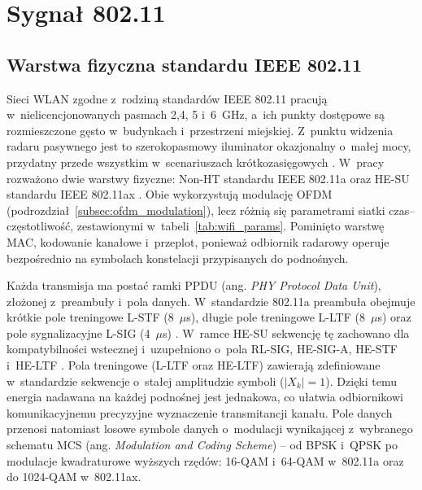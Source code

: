 \section{Sygnał 802.11}
\label{sec:wifi_signal}


\subsection{Warstwa fizyczna standardu IEEE 802.11}
\label{subsec:wifi_signal}

Sieci WLAN zgodne z~rodziną standardów IEEE 802.11 pracują w~nielicencjonowanych pasmach 2,4, 5 i~6~GHz, a~ich punkty dostępowe są rozmieszczone gęsto w~budynkach i~przestrzeni miejskiej. Z~punktu widzenia radaru pasywnego jest to szerokopasmowy iluminator okazjonalny o~małej mocy, przydatny przede wszystkim w~scenariuszach krótkozasięgowych \cite{colone2014,sorbianWykorzystanieSieciWifi2025}. W~pracy rozważono dwie warstwy fizyczne: Non-HT standardu IEEE 802.11a \cite{1999} oraz HE-SU standardu IEEE 802.11ax \cite{2021}. Obie wykorzystują modulację OFDM (podrozdział~\ref{subsec:ofdm_modulation}), lecz różnią się parametrami siatki czas--częstotliwość, zestawionymi w~tabeli~\ref{tab:wifi_params}. Pominięto warstwę MAC, kodowanie kanałowe i~przeplot, ponieważ odbiornik radarowy operuje bezpośrednio na symbolach konstelacji przypisanych do podnośnych.



Każda transmisja ma postać ramki PPDU (ang. \textit{PHY Protocol Data Unit}), złożonej z~preambuły i~pola danych. W~standardzie 802.11a preambuła obejmuje krótkie pole treningowe L-STF (8~$\mu$s), długie pole treningowe L-LTF (8~$\mu$s) oraz pole sygnalizacyjne L-SIG (4~$\mu$s) \cite{1999}. W~ramce HE-SU sekwencję tę zachowano dla kompatybilności wstecznej i~uzupełniono o~pola RL-SIG, HE-SIG-A, HE-STF i~HE-LTF \cite{2021}. Pola treningowe (L-LTF oraz HE-LTF) zawierają zdefiniowane w~standardzie sekwencje o~stałej amplitudzie symboli ($|X_k| = 1$). Dzięki temu energia nadawana na każdej podnośnej jest jednakowa, co ułatwia odbiornikowi komunikacyjnemu precyzyjne wyznaczenie transmitancji kanału. Pole danych przenosi natomiast losowe symbole danych o~modulacji wynikającej z~wybranego schematu MCS (ang. \textit{Modulation and Coding Scheme}) -- od BPSK i~QPSK po modulacje kwadraturowe wyższych rzędów: 16-QAM i~64-QAM w~802.11a oraz do 1024-QAM w~802.11ax.

